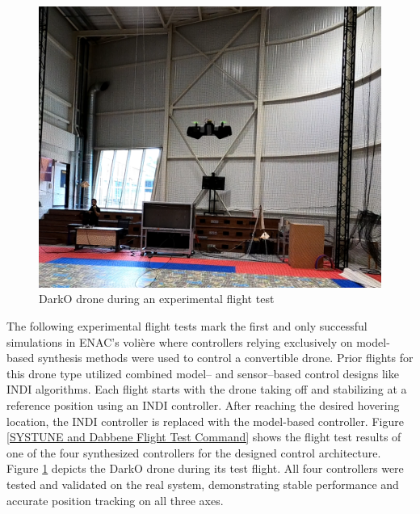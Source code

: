 \begin{figure}[ht]
    \centering
    \includegraphics[width=0.8\columnwidth]{figures/DarkOFlighthope.png}
    \vspace{-0.2cm}\caption{DarkO drone during an experimental flight test}
    \label{DarkO2}
\end{figure}

The following experimental flight tests mark the first and only successful simulations in ENAC's volière where controllers  relying exclusively on model-based synthesis methods were used to control a convertible drone. Prior flights for this drone type utilized combined model– and sensor–based control designs like INDI algorithms. Each flight starts with the drone taking off and stabilizing at a reference position using an INDI controller. After reaching the desired hovering location, the INDI controller is replaced with the model-based controller. Figure \ref{SYSTUNE and Dabbene Flight Test Command} shows the flight test results of one of the four synthesized controllers for the designed control architecture. Figure \ref{DarkO2} depicts the DarkO drone during its test flight. All four controllers were tested and validated on the real system, demonstrating stable performance and accurate position tracking on all three axes.


